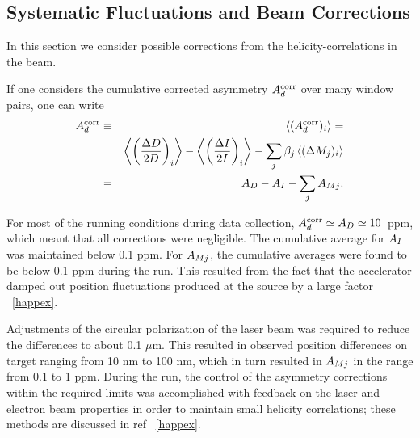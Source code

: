 \subsection{Systematic Fluctuations and Beam Corrections}
\label{sec:beamcorr}

In this section we consider possible corrections from
the helicity-correlations in the beam.

If one considers the cumulative corrected asymmetry
$A^{\rm corr}_d$ over many window pairs, one can write
\begin{eqnarray}
A^{\rm corr}_d & \equiv & \langle (A^{\rm corr}_d)_i\rangle = 
\nonumber \\
&  & 
\left\langle\left(\frac{\Delta D}{2D}\right)_i\right\rangle -
\left\langle\left(\frac{\Delta I}{2I}\right)_i\right\rangle
- \sum_j {\beta_j\left\langle{(\Delta M_j)_i}\right\rangle} 
\nonumber \\
&=& A_D -  A_I - \sum_j A_{Mj}.
\end{eqnarray}

For most of the running conditions during data collection,
$A^{\rm corr}_d\simeq A_D\simeq 10$~ppm, which meant that all
corrections were negligible. The cumulative average for $A_I$ was
maintained below 0.1 ppm. For $A_{Mj}$, the cumulative averages
were found to be below 0.1 ppm during the run.
This resulted from the fact that the accelerator
damped out position fluctuations produced at the source by a large
factor ~\ref{happex}.

Adjustments of the circular polarization of the
laser beam was required to reduce the differences to about 0.1 $\mu$m. 
This resulted in observed position differences on target
ranging from 10 nm to 100 nm, which in turn resulted in $A_{Mj}$
in the range from 0.1 to 1 ppm.
During the run, the control of the asymmetry corrections 
within the required limits was accomplished with feedback on 
the laser and electron beam properties in order to maintain 
small helicity correlations; these methods are 
discussed in ref ~\ref{happex}.
